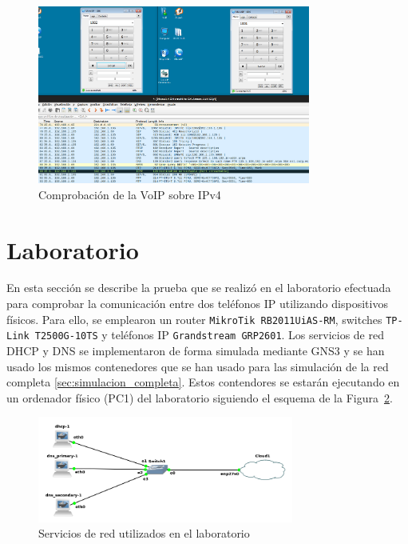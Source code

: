 \begin{figure}[H]
	\centering
	\includegraphics[width=0.8\textwidth]{images/test_voip_ipv4.png}
	\caption{Comprobación de la VoIP sobre IPv4}
	\label{fig:test_voip_ipv4}
\end{figure}

\section{Laboratorio}
En esta sección se describe la prueba que se realizó en el laboratorio efectuada para comprobar la comunicación entre dos teléfonos IP utilizando dispositivos físicos. Para ello, se emplearon un router \texttt{MikroTik RB2011UiAS-RM}, switches \texttt{TP-Link T2500G-10TS} y teléfonos IP \texttt{Grandstream GRP2601}. Los servicios de red DHCP y DNS se implementaron de forma simulada mediante GNS3 y se han usado los mismos contenedores que se han usado para las simulación de la red completa \ref{sec:simulacion_completa}. Estos contendores se estarán ejecutando en un ordenador físico (PC1) del laboratorio siguiendo el esquema de la Figura~\ref{fig:servicios_red_laboratorio}.

\begin{figure}[H]
	\centering
	\includegraphics[width=0.75\textwidth]{images/servicios_red_laboratorio.png}
	\caption{Servicios de red utilizados en el laboratorio}
	\label{fig:servicios_red_laboratorio}
\end{figure}

